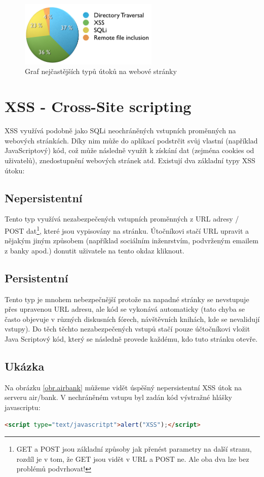 \documentclass[12pt, a4paper]{report}
\begin{document}
\begin{figure}[h!]
\centerline{\includegraphics[width=250px]{./examples/chart.png}}
\caption{Graf nejčastějších typů útoků na webové stránky}
\label{chart.attack}
\end{figure}


\section{XSS - Cross-Site scripting}
XSS využívá podobně jako SQLi neochráněných vstupních proměnných na webových stránkách. Díky nim může do aplikací podstrčit svůj vlastní (například JavaScriptový) kód, což může následně využít k získání dat (zejména cookies od uživatelů), znedostupnění webových stránek atd. Existují dva základní typy XSS útoku:

\subsection{Nepersistentní}
Tento typ využívá nezabezpečených vstupních proměnných z URL adresy / POST dat\footnote{GET a POST jsou základní způsoby jak přenést parametry na další stranu, rozdíl je v tom, že GET jsou vidět v URL a POST ne. Ale oba dva lze bez problémů podvrhovat!}, které jsou vypisovány na stránku. Útočníkovi stačí URL upravit a nějakým jiným způsobem (například sociálním inženrstvím, podvrženým emailem z banky apod.) donutit uživatele na tento okdaz kliknout. 

\subsection{Persistentní}
Tento typ je mnohem nebezpečnější protože na napadné stránky se nevstupuje přes upravenou URL adresu, ale kód se vykonává automaticky (tato chyba se často objevuje v různých diskusních fórech, návštěvních knihách, kde se nevalidují vstupy). Do těch těchto nezabezpečených vstupů stačí pouze účtočníkovi vložit Java Scriptový kód, který se následně provede každému, kdo tuto stránku otevře. 

\subsection{Ukázka}
Na obrázku \ref{obr.airbank} můžeme vidět úspěšný nepersistentní XSS útok na serveru air/bank. V nechráněném vstupu byl zadán kód výstražné hlášky javascriptu:
\begin{lstlisting}[label=some-code, language=HTML, caption=Výstražná hláška v jazyce JavaScript]
<script type="text/javascritpt">alert("XSS");</script>
\end{lstlisting}
\end{document}
